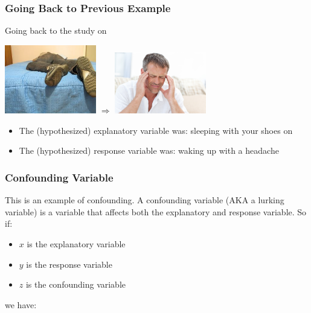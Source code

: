 \documentclass[slides]{beamer}\usepackage[]{graphicx}\usepackage[]{color}
\newcommand{\blue}[1]{\textcolor{blue2}{#1}}
\begin{document}
\begin{frame}
\frametitle{Going Back to Previous Example}

Going back to the study on 
\begin{center}
\includegraphics[width=0.3\textwidth]{shoes.jpg}
\hspace{1cm}
$\Longrightarrow$
\hspace{1cm}
\includegraphics[width=0.3\textwidth]{headache.jpg}
\end{center}

\begin{itemize}
\item The (hypothesized) explanatory variable was: sleeping with your shoes on
\item The (hypothesized) response variable was: waking up with a headache
\end{itemize}

\end{frame}


\begin{frame}
\frametitle{Confounding Variable}

This is an example of \blue{confounding}.  A confounding variable (AKA a \blue{lurking variable}) is a variable that affects both the explanatory and response variable.  So if:
\begin{itemize}
\pause\item $x$ is the explanatory variable
\pause\item $y$ is the response variable
\pause\item $z$ is the confounding variable
\end{itemize}
we have:
\vspace{3cm}

\end{frame}
\end{document}
